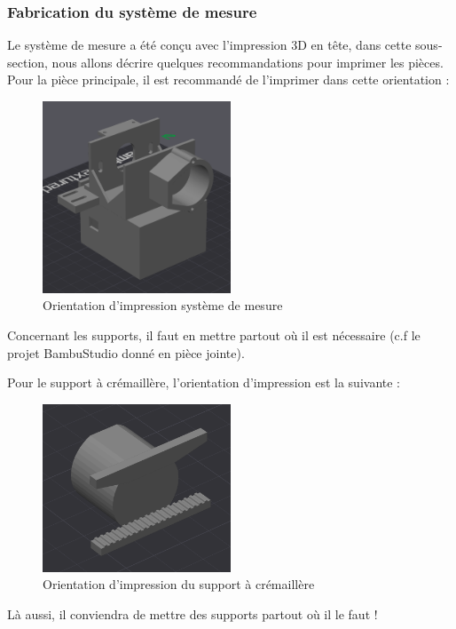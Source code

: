 \newpage
\subsubsection{Fabrication du système de mesure}
Le système de mesure a été conçu avec l'impression 3D en tête, dans cette sous-section, nous allons décrire quelques recommandations pour imprimer les pièces.
Pour la pièce principale, il est recommandé de l'imprimer dans cette orientation :

\begin{figure}[H]
    \centering
    \includegraphics[width = 0.5\textwidth]{assets/figures/ameliorations/orientation_impression_systeme_mesure.png}
    \caption{Orientation d'impression système de mesure}
\end{figure}
Concernant les supports, il faut en mettre partout où il est nécessaire (c.f le projet BambuStudio donné en pièce jointe).

Pour le support à crémaillère, l'orientation d'impression est la suivante :
\begin{figure}[H]
    \centering
    \includegraphics[width = 0.5\textwidth]{assets/figures/ameliorations/orientation_support_crémaillère.png}
    \caption{Orientation d'impression du support à crémaillère}
\end{figure}
Là aussi, il conviendra de mettre des supports partout où il le faut !

